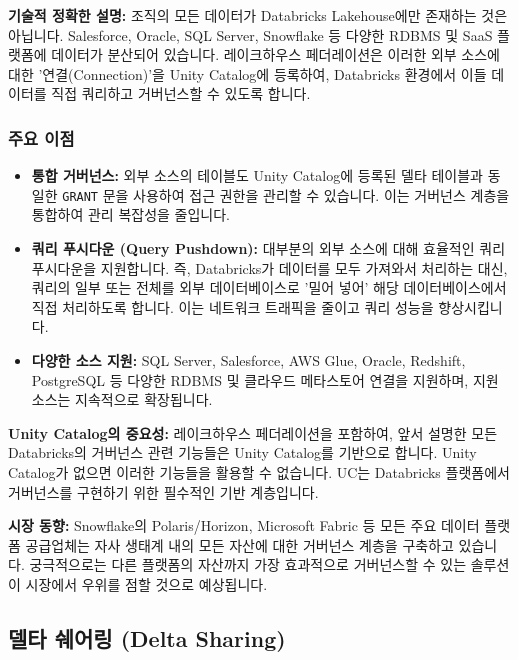 \documentclass[11pt,a4paper]{article}
\theoremstyle{definition}
\begin{document}
\textbf{기술적 정확한 설명:}
조직의 모든 데이터가 Databricks Lakehouse에만 존재하는 것은 아닙니다. Salesforce, Oracle, SQL Server, Snowflake 등 다양한 RDBMS 및 SaaS 플랫폼에 데이터가 분산되어 있습니다. 레이크하우스 페더레이션은 이러한 외부 소스에 대한 '연결(Connection)'을 Unity Catalog에 등록하여, Databricks 환경에서 이들 데이터를 직접 쿼리하고 거버넌스할 수 있도록 합니다.

\subsubsection*{주요 이점}
\begin{itemize}
    \item \textbf{통합 거버넌스:} 외부 소스의 테이블도 Unity Catalog에 등록된 델타 테이블과 동일한 \texttt{GRANT} 문을 사용하여 접근 권한을 관리할 수 있습니다. 이는 거버넌스 계층을 통합하여 관리 복잡성을 줄입니다.
    \item \textbf{쿼리 푸시다운 (Query Pushdown):} 대부분의 외부 소스에 대해 효율적인 쿼리 푸시다운을 지원합니다. 즉, Databricks가 데이터를 모두 가져와서 처리하는 대신, 쿼리의 일부 또는 전체를 외부 데이터베이스로 '밀어 넣어' 해당 데이터베이스에서 직접 처리하도록 합니다. 이는 네트워크 트래픽을 줄이고 쿼리 성능을 향상시킵니다.
    \item \textbf{다양한 소스 지원:} SQL Server, Salesforce, AWS Glue, Oracle, Redshift, PostgreSQL 등 다양한 RDBMS 및 클라우드 메타스토어 연결을 지원하며, 지원 소스는 지속적으로 확장됩니다.
\end{itemize}

\begin{cautionbox}
\textbf{Unity Catalog의 중요성:}
레이크하우스 페더레이션을 포함하여, 앞서 설명한 모든 Databricks의 거버넌스 관련 기능들은 Unity Catalog를 기반으로 합니다. Unity Catalog가 없으면 이러한 기능들을 활용할 수 없습니다. UC는 Databricks 플랫폼에서 거버넌스를 구현하기 위한 필수적인 기반 계층입니다.
\end{cautionbox}

\begin{tcolorbox}[summarybox]
\textbf{시장 동향:}
Snowflake의 Polaris/Horizon, Microsoft Fabric 등 모든 주요 데이터 플랫폼 공급업체는 자사 생태계 내의 모든 자산에 대한 거버넌스 계층을 구축하고 있습니다. 궁극적으로는 다른 플랫폼의 자산까지 가장 효과적으로 거버넌스할 수 있는 솔루션이 시장에서 우위를 점할 것으로 예상됩니다.
\end{tcolorbox}

\newpage
\subsection*{델타 쉐어링 (Delta Sharing)}
\end{document}
